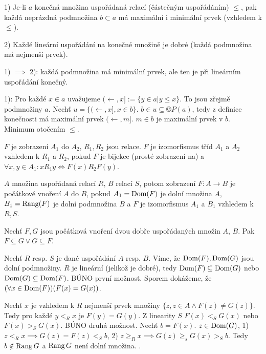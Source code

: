 \documentclass[12pt]{article}                   %
\begin{document}
    \begin{veta}
        1) Je-li $a$ konečná množina uspořádaná relací (částečným uspořádáním) $≤$, pak každá neprázdná podmnožina $b \subset a$ má maximální i minimální prvek (vzhledem k $≤$).

        2) Každé lineární uspořádání na konečné množině je dobré (každá podmnožina má nejmenší prvek).

        \begin{dukazin}
            1) $\implies$ 2): každá podmnožina má minimální prvek, ale ten je při lineárním uspořádání konečný.

            1): Pro každé $x \in a$ uvažujeme $(\leftarrow, x] := \{y \in a | y ≤ x\}$. To jsou zřejmě podmnožiny $a$. Nechť $u = \{(\leftarrow, x], x \in b\}$. $b \in u \subseteq ©P(a)$, tedy z definice konečnosti má maximální prvek $(\leftarrow, m]$. $m \in b$ je maximální prvek v $b$. Minimum otočením $≤$.
        \end{dukazin}
    \end{veta}

    \begin{definice}[Izomorfismus]
        $F$ je zobrazení $A_1$ do $A_2$, $R_1, R_2$ jsou relace. $F$ je izomorfismus tříd $A_1$ a $A_2$ vzhledem k $R_1$ a $R_2$, pokud $F$ je bijekce (prosté zobrazení na) a $\forall x, y \in A_1: xR_1y \Leftrightarrow F(x)R_2F(y)$.
    \end{definice}

    \begin{definice}
        $A$ množina uspořádaná relací $R$, $B$ relací $S$, potom zobrazení $F: A \rightarrow B$ je počátkové vnoření $A$ do $B$, pokud $A_1 = \operatorname{Dom}(F)$ je dolní množina $A$, $B_1 = \operatorname{Rang}(F)$ je dolní podmnožina $B$ a $F$ je izomorfismus $A_1$ a $B_1$ vzhledem k $R, S$.
    \end{definice}

    \begin{lemma}
        Nechť $F, G$ jsou počátková vnoření dvou dobře uspořádaných množin $A$, $B$. Pak $F \subseteq G \lor G \subseteq F$.

        \begin{dukazin}
            Nechť $R$ resp. $S$ je dané uspořádání $A$ resp. $B$. Víme, že $\operatorname{Dom}(F), \operatorname{Dom}(G)$ jsou dolní podmnožiny. $R$ je lineární (jelikož je dobré), tedy $\operatorname{Dom}(F) \subseteq \operatorname{Dom}(G)$ nebo $\operatorname{Dom}(G)\subseteq \operatorname{Dom}(F)$. BÚNO první možnost. Sporem dokážeme, že $(\forall x \in \operatorname{Dom}(F))(F(x) = G(x))$.

            Nechť $x$ je vzhledem k $R$ nejmenší prvek množiny $\{z, z\in A \land F(z)≠G(z)\}$. Tedy pro každé $y <_R x$ je $F(y) = G(y)$. Z linearity $S$ $F(x) <_S G(x)$ nebo $F(x) >_S G(x)$. BÚNO druhá možnost. Nechť $b = F(x)$. $z \in \operatorname{Dom}(G)$, 1) $z <_R x \implies G(z) = F(z) <_S b$, 2) $z ≥_R x \implies G(z) ≥_s G(x) >_S b$. Tedy $b \notin \operatorname{Rang} G$ a $\operatorname{Rang} G$ není dolní množina. \lightning.
        \end{dukazin}
    \end{lemma}
\end{document}

